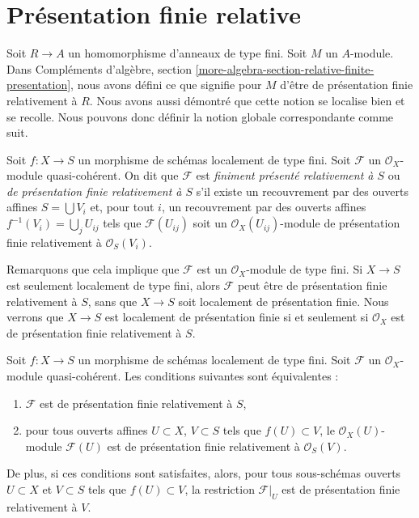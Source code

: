 \section{Présentation finie relative}
\label{section-finite-type-finite-presentation}

\noindent
Soit $R \to A$ un homomorphisme d'anneaux de type fini. Soit $M$ un $A$-module. Dans
Compléments d'algèbre,
section \ref{more-algebra-section-relative-finite-presentation},
nous avons défini ce que signifie pour $M$ d'être de présentation finie relativement à $R$.
Nous avons aussi démontré que cette notion se localise bien et se recolle.
Nous pouvons donc définir la notion globale correspondante comme suit.

\begin{definition}
\label{definition-relatively-finitely-presented-sheaf}
Soit $f : X \to S$ un morphisme de schémas localement de type fini.
Soit $\mathcal{F}$ un $\mathcal{O}_X$-module quasi-cohérent. On dit que
$\mathcal{F}$ est {\it finiment présenté relativement à $S$} ou
{\it de présentation finie relativement à $S$}
s'il existe un recouvrement par des ouverts affines $S = \bigcup V_i$ et,
pour tout $i$, un recouvrement par des ouverts affines
$f^{-1}(V_i) = \bigcup_j U_{ij}$ tels que $\mathcal{F}(U_{ij})$
soit un $\mathcal{O}_X(U_{ij})$-module de présentation finie relativement
à $\mathcal{O}_S(V_i)$.
\end{definition}

\noindent
Remarquons que cela implique que $\mathcal{F}$ est un
$\mathcal{O}_X$-module de type fini. Si $X \to S$ est seulement localement de type
fini, alors $\mathcal{F}$ peut être de présentation finie relativement
à $S$, sans que $X \to S$ soit localement de présentation finie.
Nous verrons que $X \to S$ est localement de présentation finie si
et seulement si $\mathcal{O}_X$ est de présentation finie relativement à $S$.

\begin{lemma}
\label{lemma-relative-finite-presentation-characterize}
Soit $f : X \to S$ un morphisme de schémas localement de type fini.
Soit $\mathcal{F}$ un $\mathcal{O}_X$-module quasi-cohérent. Les conditions suivantes
sont équivalentes :
\begin{enumerate}
\item $\mathcal{F}$ est de présentation finie relativement à $S$,
\item pour tous ouverts affines $U \subset X$, $V \subset S$
tels que $f(U) \subset V$, le $\mathcal{O}_X(U)$-module $\mathcal{F}(U)$
est de présentation finie relativement à $\mathcal{O}_S(V)$.
\end{enumerate}
De plus, si ces conditions sont satisfaites, alors, pour tous sous-schémas ouverts
$U \subset X$ et $V \subset S$ tels que $f(U) \subset V$,
la restriction $\mathcal{F}|_U$ est de présentation finie relativement à $V$.
\end{lemma}

